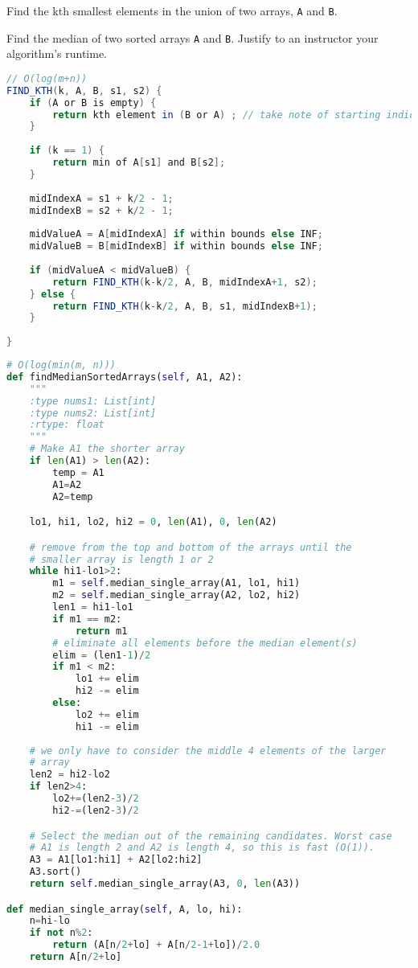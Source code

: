 
\item Find the kth smallest elements in the union of two arrays, \texttt{A} and \texttt{B}.
\item Find the median of two sorted arrays \texttt{A} and \texttt{B}. Justify to an instructor your algorithm's runtime.

\begin{lstlisting}[language=Java]
// O(log(m+n))
FIND_KTH(k, A, B, s1, s2) {
    if (A or B is empty) {
        return kth element in (B or A) ; // take note of starting indices s1/s2
    }
    
    if (k == 1) {
        return min of A[s1] and B[s2];
    }
    
    midIndexA = s1 + k/2 - 1;
    midIndexB = s2 + k/2 - 1;
    
    midValueA = A[midIndexA] if within bounds else INF;
    midValueB = B[midIndexB] if within bounds else INF;
    
    if (midValueA < midValueB) {
        return FIND_KTH(k-k/2, A, B, midIndexA+1, s2);
    } else {
        return FIND_KTH(k-k/2, A, B, s1, midIndexB+1);
    }
    
}
\end{lstlisting}

\begin{lstlisting}[language=Python]
# O(log(min(m, n)))
def findMedianSortedArrays(self, A1, A2):
    """
    :type nums1: List[int]
    :type nums2: List[int]
    :rtype: float
    """
    # Make A1 the shorter array
    if len(A1) > len(A2):
        temp = A1
        A1=A2
        A2=temp

    lo1, hi1, lo2, hi2 = 0, len(A1), 0, len(A2)

    # remove from the top and bottom of the arrays until the
    # smaller array is length 1 or 2
    while hi1-lo1>2:
        m1 = self.median_single_array(A1, lo1, hi1)
        m2 = self.median_single_array(A2, lo2, hi2)
        len1 = hi1-lo1
        if m1 == m2:
            return m1
        # eliminate all elements before the median element(s)
        elim = (len1-1)/2
        if m1 < m2:
            lo1 += elim
            hi2 -= elim
        else:
            lo2 += elim
            hi1 -= elim
    
    # we only have to consider the middle 4 elements of the larger
    # array
    len2 = hi2-lo2
    if len2>4:
        lo2+=(len2-3)/2
        hi2-=(len2-3)/2

    # Select the median out of the remaining candidates. Worst case
    # A1 is length 2 and A2 is length 4, so this is fast (O(1)).
    A3 = A1[lo1:hi1] + A2[lo2:hi2]
    A3.sort()
    return self.median_single_array(A3, 0, len(A3))

def median_single_array(self, A, lo, hi):
    n=hi-lo
    if not n%2:
        return (A[n/2+lo] + A[n/2-1+lo])/2.0
    return A[n/2+lo]
\end{lstlisting}

